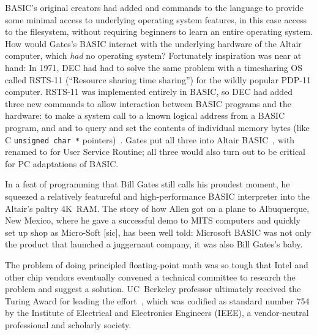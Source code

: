 BASIC's original creators had added  and  commands to the
language to
provide some minimal access to underlying operating system features, in
this case access to the filesystem,
without requiring beginners to learn an entire operating system.
How would Gates's BASIC interact with the underlying hardware of 
the Altair computer, which \emph{had} no operating
system?
Fortunately inspiration was near at hand:
In 1971, DEC had had to solve the same problem with a
timesharing OS called RSTS-11 (``Resource sharing time
sharing'') for the wildly popular PDP-11 computer.
RSTS-11 was implemented entirely in BASIC, so DEC had added
three new commands to allow interaction between BASIC programs and the
hardware:  to make a system call to a
known logical address from a BASIC program, and
 and  to query and set the contents of individual memory
bytes (like C \texttt{unsigned char~*}
pointers)~\cite[pp.~204--205]{ceruzzi}.
Gates put all three into Altair BASIC~\cite{smithsonian_interview},
with  renamed to  for User Service Routine; all three
would also turn out to be critical for PC adaptations of BASIC.

In a feat of programming that Bill Gates still calls his proudest
moment, he squeezed a relatively featureful and high-performance BASIC
interpreter into the Altair's paltry 4K~RAM.
The story of how Allen got on a plane to Albuquerque, New Mexico, where
he gave a successful demo to MITS computers and quickly set up shop as
Micro-Soft [sic], has been well told: Microsoft BASIC was not only the
product that launched a juggernaut company, it was also Bill Gates's
baby.


  \begin{tangent}
  The problem of doing principled
  floating-point math was so tough that Intel 
  and other chip vendors eventually convened a technical committee to
  research the problem 
  and suggest a solution. UC~Berkeley professor 
  ultimately received the 
  Turing Award for
  leading the effort~\cite{kahan_interview}, which was codified as
  standard number 754 by the  Institute of Electrical and 
  Electronics Engineers (IEEE), a vendor-neutral professional and scholarly
  society. 
  \end{tangent}

